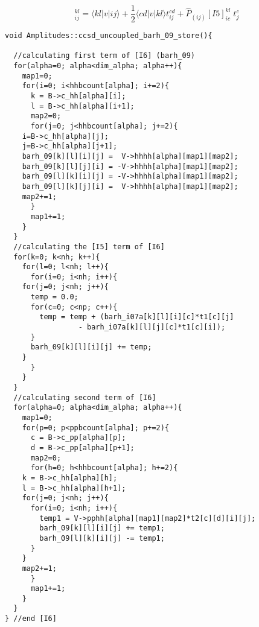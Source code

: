 \begin{equation*}
 [I6]_{ij}^{kl}=\langle kl|v|ij\rangle+\frac{1}{2}\langle cd|v|kl\rangle t_{ij}^{cd}+\hat{P}_{(ij)}[I5]_{ic}^{kl}\phantom{.}t_j^c
\end{equation*}
\begin{lstlisting}[label={list:impl:intermediate6},caption={implementation of I6 in the amp1 class function ccsd\_uncoupled\_barh\_09\_store}]
void Amplitudes::ccsd_uncoupled_barh_09_store(){
 
  //calculating first term of [I6] (barh_09)
  for(alpha=0; alpha<dim_alpha; alpha++){
    map1=0;
    for(i=0; i<hhbcount[alpha]; i+=2){
      k = B->c_hh[alpha][i];
      l = B->c_hh[alpha][i+1];
      map2=0;
      for(j=0; j<hhbcount[alpha]; j+=2){
	i=B->c_hh[alpha][j];
	j=B->c_hh[alpha][j+1];
	barh_09[k][l][i][j] =  V->hhhh[alpha][map1][map2];
	barh_09[k][l][j][i] = -V->hhhh[alpha][map1][map2];
	barh_09[l][k][i][j] = -V->hhhh[alpha][map1][map2];
	barh_09[l][k][j][i] =  V->hhhh[alpha][map1][map2];
	map2+=1;
      }
      map1+=1;
    }
  }
  //calculating the [I5] term of [I6]
  for(k=0; k<nh; k++){
    for(l=0; l<nh; l++){
      for(i=0; i<nh; i++){ 
	for(j=0; j<nh; j++){	
	  temp = 0.0;
	  for(c=0; c<np; c++){
	    temp = temp + (barh_i07a[k][l][i][c]*t1[c][j] 
                 - barh_i07a[k][l][j][c]*t1[c][i]);
	  }
	  barh_09[k][l][i][j] += temp;
	}
      }
    }
  }
  //calculating second term of [I6]
  for(alpha=0; alpha<dim_alpha; alpha++){
    map1=0;
    for(p=0; p<ppbcount[alpha]; p+=2){
      c = B->c_pp[alpha][p];
      d = B->c_pp[alpha][p+1];
      map2=0;
      for(h=0; h<hhbcount[alpha]; h+=2){ 
	k = B->c_hh[alpha][h];
	l = B->c_hh[alpha][h+1];
	for(j=0; j<nh; j++){
	  for(i=0; i<nh; i++){ 
	    temp1 = V->pphh[alpha][map1][map2]*t2[c][d][i][j];
	    barh_09[k][l][i][j] += temp1;
	    barh_09[l][k][i][j] -= temp1;
	  }
	}
	map2+=1;
      }
      map1+=1;
    }
  }    
} //end [I6]
\end{lstlisting}

